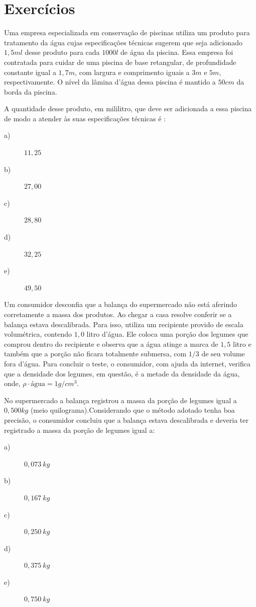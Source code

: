 \section{Exercícios}

	\begin{exercise}[ENEM 2017]
	Uma empresa especializada em conservação de piscinas utiliza um produto para tratamento da água cujas especificações técnicas sugerem que seja adicionado $1,5 ml$ desse produto para cada $1000 l$ de água da piscina. Essa empresa foi contratada para cuidar de uma piscina de base retangular, de profundidade constante igual a $1,7 m$, com largura e comprimento iguais a $3 m$ e $5 m$, respectivamente. O nível da lâmina d’água dessa piscina é mantido a $50 cm$ da borda da piscina.

A quantidade desse produto, em mililitro, que deve ser adicionada a essa piscina de modo a atender às suas especificações técnicas é :
    \begin{description}
        \item[a)] $11,25$
        \item[b)] $27,00$
        \item[c)] $28,80$
        \item[d)] $32,25$
        \item[e)] $49,50$
    \end{description}
\end{exercise}

\begin{exercise}[ENEM 2010]
Um consumidor desconfia que a balança do supermercado não está aferindo corretamente a massa dos produtos. Ao chegar a casa resolve conferir se a balança estava descalibrada. Para isso, utiliza um recipiente provido de escala volumétrica, contendo $1,0$ litro d’água. Ele coloca uma porção dos legumes que comprou dentro do recipiente e observa que a água atinge a marca de $1,5$ litro e também que a porção não ficara totalmente submersa, com $1/3$ de seu volume fora d’água. Para concluir o teste, o consumidor, com ajuda da internet, verifica que a  densidade dos legumes, em questão, é a metade da densidade da água, onde, $ \rho \cdot \textrm{água} = 1 g/cm^{3}$.

No supermercado a balança registrou a massa da porção de legumes igual a $0,500 kg$ (meio quilograma).Considerando que o método adotado tenha boa precisão, o consumidor concluiu que a balança estava descalibrada e deveria ter registrado a massa da porção de legumes igual a:

    \begin{description}
        \item[a)] $0,073~kg$
        \item[b)] $0,167~kg$
        \item[c)] $0,250~kg$
        \item[d)] $0,375~kg$
        \item[e)] $0,750~kg$
    \end{description}
\end{exercise}
	
